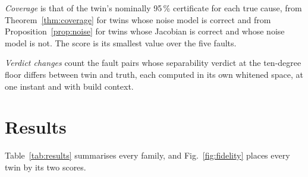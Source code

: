 \documentclass[preprint,12pt]{elsarticle}
\begin{document}
\emph{Coverage} is that of the twin's nominally 95\,\% certificate for each true
cause, from Theorem~\ref{thm:coverage} for twins whose noise model is correct
and from Proposition~\ref{prop:noise} for twins whose Jacobian is correct and
whose noise model is not. The score is its smallest value over the five faults.

\emph{Verdict changes} count the fault pairs whose separability verdict at the
ten-degree floor differs between twin and truth, each computed in its own
whitened space, at one instant and with build context.

\section{Results}
\label{sec:results}

Table~\ref{tab:results} summarises every family, and Fig.~\ref{fig:fidelity}
places every twin by its two scores.
\end{document}
